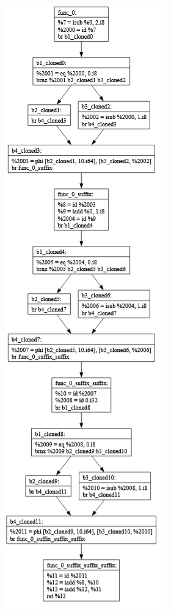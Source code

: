 \documentclass[11pt, a4paper, titlepage]{article}
\begin{document}
\begin{figure}[H]
  \includegraphics[scale=0.3]{images/i43.png}

\end{figure}
\end{document}
